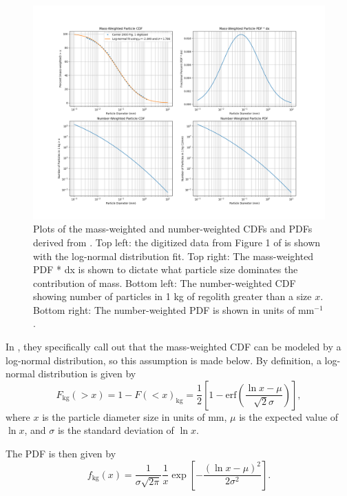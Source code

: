 \documentclass{article}
\begin{document}
\begin{figure}[h!]
	\centering
	\includegraphics[width=1.1\textwidth]{Carrier2003_CDFs_PDFs.png}
	\caption{Plots of the mass-weighted and number-weighted CDFs and PDFs derived from \cite{carrier2003particle}. Top left: the digitized data from Figure 1 of \cite{carrier2003particle} is shown with the log-normal distribution fit. Top right: The mass-weighted PDF * dx is shown to dictate what particle size dominates the contribution of mass. Bottom left: The number-weighted CDF showing number of particles in 1 kg of regolith greater than a size $x$. Bottom right: The number-weighted PDF is shown in units of mm$^{-1}$.}\label{fig:Carrier2003_CDFs_PDFs}
\end{figure}

In \cite{carrier2003particle}, they specifically call out that the mass-weighted CDF can be modeled by a log-normal distribution, so this assumption is made below. By definition, a log-normal distribution is given by
\begin{equation}
F_{\text{kg}}(>x) = 1 - F(<x)_{\text{kg}} = \frac{1}{2}\left[1 - \text{erf}\left(\frac{\ln x - \mu}{\sqrt{2}\sigma}\right)\right],
\end{equation}
where $x$ is the particle diameter size in units of mm, $\mu$ is the expected value of $\ln x$, and $\sigma$ is the standard deviation of $\ln x$.

The PDF is then given by
\begin{equation}
f_{\text{kg}}(x) = \frac{1}{\sigma\sqrt{2\pi}}\frac{1}{x}\exp\left[-\frac{(\ln x - \mu)^2}{2\sigma^2}\right].
\end{equation}
\end{document}
